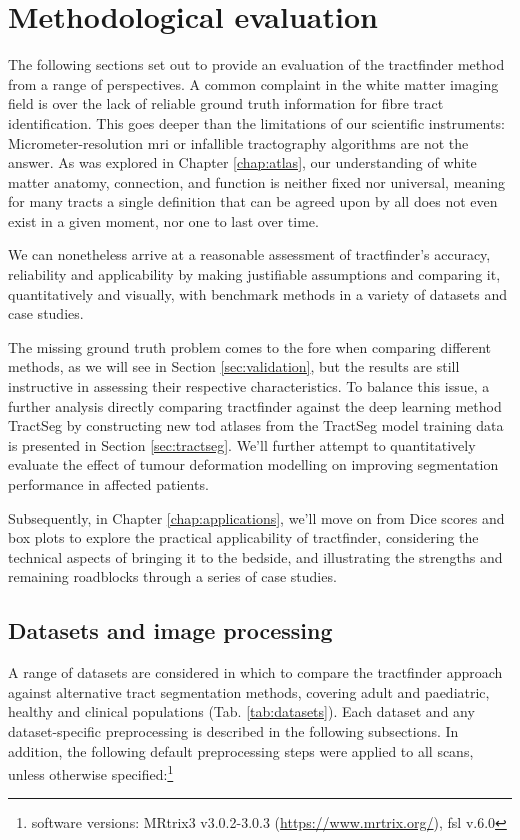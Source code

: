 \chapter{Methodological evaluation}\label{chap:eval}

The following sections set out to provide an evaluation of the tractfinder method from a range of perspectives.
A common complaint in the white matter imaging field is over the lack of reliable ground truth information for fibre tract identification.
This goes deeper than the limitations of our scientific instruments:
Micrometer-resolution \gls{mri} or infallible tractography algorithms are not the answer.
As was explored in Chapter \ref{chap:atlas}, our understanding of white matter anatomy, connection, and function is neither fixed nor universal, meaning for many tracts a single definition that can be agreed upon by all does not even exist in a given moment, nor one to last over time.

We can nonetheless arrive at a reasonable assessment of tractfinder's accuracy, reliability and applicability by making justifiable assumptions and comparing it, quantitatively and visually, with benchmark methods in a variety of datasets and case studies.

The missing ground truth problem comes to the fore when comparing different methods, as we will see in Section \ref{sec:validation}, but the results are still instructive in assessing their respective characteristics.
To balance this issue, a further analysis directly comparing tractfinder against the deep learning method TractSeg by constructing new \gls{tod} atlases from the TractSeg model training data is presented in Section \ref{sec:tractseg}.
We'll further attempt to quantitatively evaluate the effect of tumour deformation modelling on improving segmentation performance in affected patients.

Subsequently, in Chapter \ref{chap:applications}, we'll move on from Dice scores and box plots to explore the practical applicability of tractfinder, considering the technical aspects of bringing it to the bedside, and illustrating the strengths and remaining roadblocks through a series of case studies.

\section{Datasets and image processing}
\label{sec:data}

A range of datasets are considered in which to compare the tractfinder approach against alternative tract segmentation methods, covering adult and paediatric, healthy and clinical populations (Tab. \ref{tab:datasets}).
Each dataset and any dataset-specific preprocessing is described in the following subsections.
In addition, the following default preprocessing steps were applied to all scans, unless otherwise specified:\footnote[2]{software versions: MRtrix3 v3.0.2-3.0.3 (\url{https://www.mrtrix.org/}), \gls{fsl} v.6.0}

